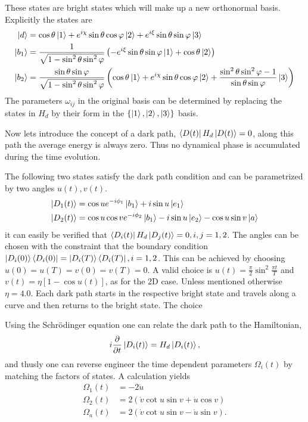 These states are bright states which will make up a new orthonormal basis. 
Explicitly the states are 
\begin{equation}
\label{eq:states}
\begin{aligned}
\ket{d} &= \cos\theta\ket{1} + e^{i\chi}\sin\theta\cos\varphi\ket{2} + e^{i\xi}\sin\theta\sin\varphi\ket{3}
\\
\ket{b_1} &= \frac{1}{\sqrt{1-\sin^2\theta\sin^2\varphi}} \left(-e^{i\xi}\sin\theta\sin\varphi\ket{1} + \cos\theta\ket{2} \right)
\\
\ket{b_2} &= \frac{\sin\theta\sin\varphi}{\sqrt{1-\sin^2\theta\sin^2\varphi}} \left(\cos\theta\ket{1} + e^{i\chi}\sin\theta\cos\varphi\ket{2} + \frac{\sin^2\theta\sin^2\varphi - 1}{\sin\theta\sin\varphi} \ket{3}\right)
\end{aligned}
\end{equation}
The parameters $\omega_{ij}$ in the original basis can be determined by replacing the states in $H_d$ by their form in the $\{\ket{1},\ket{2},\ket{3}\}$ basis.

Now lets introduce the concept of a dark path, $\bra{D(t)}H_d\ket{D(t)} = 0$, along this path the average energy is always zero. Thus no dynamical phase is accumulated during the time evolution.

The following two states satisfy the dark path condition and can be parametrized by two angles $u(t), v(t)$.
\begin{equation}
\label{eq:dpaths}
\begin{aligned}
\ket{D_1(t)} &= \cos u e^{-i\phi_1}\ket{b_1} + i\sin u \ket{e_1}
\\
\ket{D_2(t)} &= \cos u\cos v e^{-i\phi_2}\ket{b_1} - i\sin u \ket{e_2} - \cos u\sin v \ket{a}
\end{aligned}
\end{equation}
it can easily be verified that $\bra{D_i(t)}H_d\ket{D_j(t)} = 0, i,j = 1,2$. The angles can be chosen with the constraint that the boundary condition $\ket{D_i(0)}\bra{D_i(0)} = \ket{D_i(T)}\bra{D_i(T)}, i = 1,2$. This can be achieved by choosing $u(0) = u(T) = v(0) = v(T) = 0$. A valid choice is $u(t) = \frac{\pi}{2}\sin^2\frac{\pi t}{T}$ and $v(t) = \eta\left[1 - \cos u(t)\right]$, as for the 2D case. Unless mentioned otherwise $\eta = 4.0$. Each dark path starts in the respective bright state and travels along a curve and then returns to the bright state. The choice 

Using the Schrödinger equation one can relate the dark path to the Hamiltonian,
\begin{equation}
i\pdv{}{t}\ket{D_i(t)} = H_d\ket{D_i(t)},
\end{equation}
and thusly one can reverse engineer the time dependent parameters $\Omega_i(t)$ by matching the factors of states. A calculation yields 
\begin{equation}
\begin{aligned}
\Omega_1(t) &= -2\dot{u}
\\ 
\Omega_2(t) &= 2\left(\dot{v}\cot u\sin v + \dot{u}\cos v \right)
\\
\Omega_a(t) &= 2\left(\dot{v}\cot u\sin v - \dot{u}\sin v \right).
\end{aligned}
\end{equation}

